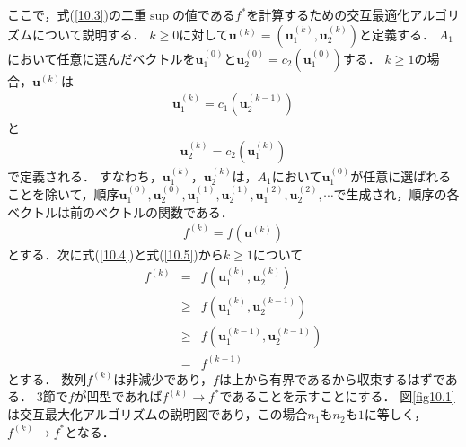 \documentclass{ltjsarticle}
\theoremstyle{definition}
\begin{document}
ここで，式(\ref{10.3})の二重$\sup$の値である$f^{*}$を計算するための交互最適化アルゴリズムについて説明する．
$k \geq 0$に対して$\mathbf{u}^{(k)} = ( \mathbf{u}_1^{(k)}, \mathbf{u}_2^{(k)} )$と定義する．
$A_1$において任意に選んだベクトルを$\mathbf{u}_1^{(0)}$と$\mathbf{u}_2^{(0)}=c_2 (\mathbf{u}_1^{(0)} )$する．
$k \geq 1$の場合，$\mathbf{u}^{(k)}$は
\begin{eqnarray}
  \label{10.7}
  \mathbf{u}_1^{(k)} = c_1 ( \mathbf{u}_2^{(k-1)} )
\end{eqnarray}
と
\begin{eqnarray}
  \label{10.8}
  \mathbf{u}_2^{(k)} = c_2 ( \mathbf{u}_1^{(k)} )
\end{eqnarray}
で定義される．
すなわち，$\mathbf{u}_1^{(k)}$，$\mathbf{u}_2^{(k)}$は，$A_1$において$\mathbf{u}_1^{(0)}$が任意に選ばれることを除いて，順序$\mathbf{u}_1^{(0)}, \mathbf{u}_2^{(0)}, \mathbf{u}_1^{(1)}, \mathbf{u}_2^{(1)}, \mathbf{u}_1^{(2)}, \mathbf{u}_2^{(2)}, \cdots$で生成され，順序の各ベクトルは前のベクトルの関数である．
\begin{eqnarray}
  \label{10.9}
  f^{(k)} = f( \mathbf{u}^{(k)})
\end{eqnarray}
とする．次に式(\ref{10.4})と式(\ref{10.5})から$k \geq 1$について
\begin{eqnarray}
  \label{10.10}
  f^{(k)} &=& f\left(\mathbf{u}_1^{(k)}, \mathbf{u}_2^{(k)}\right) \\
  \label{10.11}
  &\geq& f \left(\mathbf{u}_1^{(k)}, \mathbf{u}_2^{(k-1)}\right) \\
  \label{10.12} 
  &\geq& f \left(\mathbf{u}_1^{(k-1)}, \mathbf{u}_2^{(k-1)}\right) \\
  \label{10.13}
  &=& f^{(k-1)}
\end{eqnarray}
とする．
数列$f^{(k)}$は非減少であり，$f$は上から有界であるから収束するはずである．
3節で$f$が凹型であれば$f^{(k)} \rightarrow f^*$であることを示すことにする．
図\ref{fig10.1}は交互最大化アルゴリズムの説明図であり，この場合$n_1$も$n_2$も$1$に等しく，$f^{(k)} \rightarrow f^*$となる．
\end{document}
